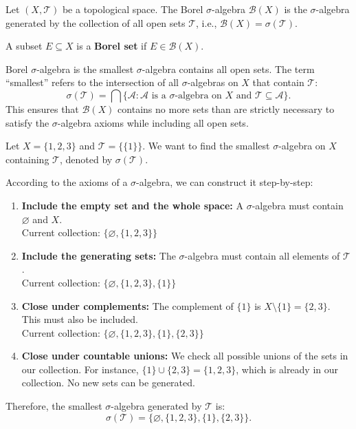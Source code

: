 \begin{definition}
    Let $(X, \mathcal{T})$ be a topological space. The Borel $\sigma$-algebra $\mathcal{B}(X)$ is the $\sigma$-algebra generated by the collection of all open sets $\mathcal{T}$, i.e., $\mathcal{B}(X) = \sigma(\mathcal{T})$.
    
    A subset $E \subseteq X$ is a \textbf{Borel set} if $E \in \mathcal{B}(X)$. 
\end{definition}

\begin{remark}
    Borel $\sigma$-algebra is the smallest $\sigma$-algebra contains all open sets.
    The term ``smallest'' refers to the intersection of all $\sigma$-algebras on $X$ that contain $\mathcal{T}$:
    \[ \sigma(\mathcal{T}) = \bigcap \{ \mathcal{A} : \mathcal{A} \text{ is a } \sigma\text{-algebra on } X \text{ and } \mathcal{T} \subseteq \mathcal{A} \}. \]
    This ensures that $\mathcal{B}(X)$ contains no more sets than are strictly necessary to satisfy the $\sigma$-algebra axioms while including all open sets.
\end{remark}

\begin{example}
    Let $X = \{1, 2, 3\}$ and $\mathcal{T} = \{\{1\}\}$. We want to find the smallest $\sigma$-algebra on $X$ containing $\mathcal{T}$, denoted by $\sigma(\mathcal{T})$.

    According to the axioms of a $\sigma$-algebra, we can construct it step-by-step:
    \begin{enumerate}
        \item \textbf{Include the empty set and the whole space:} 
        A $\sigma$-algebra must contain $\varnothing$ and $X$. \\
        Current collection: $\{ \varnothing, \{1, 2, 3\} \}$
        
        \item \textbf{Include the generating sets:} 
        The $\sigma$-algebra must contain all elements of $\mathcal{T}$. \\
        Current collection: $\{ \varnothing, \{1, 2, 3\}, \{1\} \}$
        
        \item \textbf{Close under complements:} 
        The complement of $\{1\}$ is $X \setminus \{1\} = \{2, 3\}$. This must also be included. \\
        Current collection: $\{ \varnothing, \{1, 2, 3\}, \{1\}, \{2, 3\} \}$
        
        \item \textbf{Close under countable unions:} 
        We check all possible unions of the sets in our collection. For instance, $\{1\} \cup \{2, 3\} = \{1, 2, 3\}$, which is already in our collection. No new sets can be generated.
    \end{enumerate}

    Therefore, the smallest $\sigma$-algebra generated by $\mathcal{T}$ is:
    \[ \sigma(\mathcal{T}) = \{ \varnothing, \{1, 2, 3\}, \{1\}, \{2, 3\} \}. \]
\end{example}

